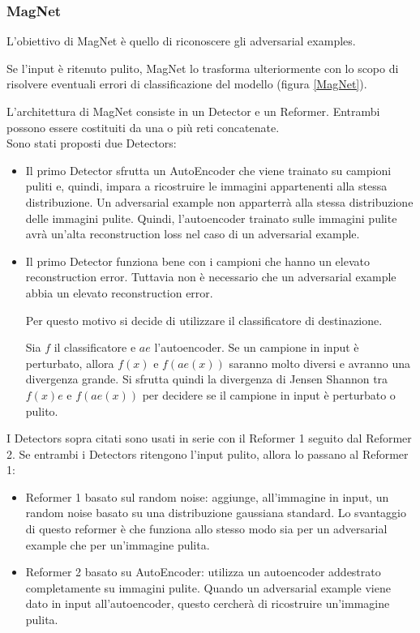         \subsubsection{MagNet}
        L'obiettivo di MagNet %
        \cite{meng2017magnet} è quello di riconoscere gli adversarial examples.
        
        Se l'input è ritenuto pulito, MagNet lo trasforma ulteriormente con lo scopo di risolvere eventuali errori di classificazione del modello (figura \ref{MagNet}).
        
        L'architettura di MagNet consiste in un Detector e un Reformer. Entrambi possono essere costituiti da una o più reti concatenate.\\
        
        Sono stati proposti due Detectors:
            \begin{itemize}
                \item Il primo Detector sfrutta un AutoEncoder che viene trainato su campioni puliti e, quindi, impara a ricostruire le immagini appartenenti alla stessa distribuzione. Un adversarial example non apparterrà alla stessa distribuzione delle immagini pulite. Quindi, l'autoencoder trainato sulle immagini pulite avrà un'alta reconstruction loss nel caso di un adversarial example.
                \item Il primo Detector funziona bene con i campioni che hanno un elevato reconstruction error. Tuttavia non è necessario che un adversarial example abbia un elevato reconstruction error.
                
                Per questo motivo si decide di utilizzare il classificatore di destinazione. 
                
                Sia $f$ il classificatore e $ae$ l'autoencoder. Se un campione in input è perturbato, allora $f(x)$ e $f(ae(x))$ saranno molto diversi e avranno una divergenza grande.
                Si sfrutta quindi la divergenza di Jensen Shannon tra $f(x) e$ e $f(ae(x))$ per decidere se il campione in input è perturbato o pulito.
            \end{itemize}
        I Detectors sopra citati sono usati in serie con il Reformer 1 seguito dal Reformer 2. Se entrambi i Detectors ritengono l'input pulito, allora lo passano al Reformer 1:
            \begin{itemize}
                \item Reformer 1 basato sul random noise: aggiunge, all'immagine in input, un random noise basato su una distribuzione gaussiana standard. Lo svantaggio di questo reformer è che funziona allo stesso modo sia per un adversarial example che per un'immagine pulita.
                \item Reformer 2 basato su AutoEncoder: utilizza un autoencoder addestrato completamente su immagini pulite. Quando un adversarial example viene dato in input all'autoencoder, questo cercherà di ricostruire un'immagine pulita.
            \end{itemize}
        
